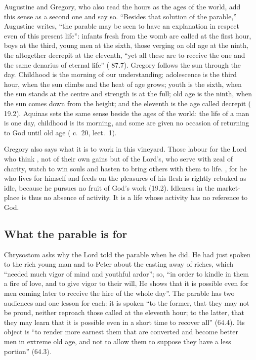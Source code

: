 Augustine and Gregory, who also read the hours as the ages of the world, add
this sense as a second one and say so. ``Besides that solution of the
parable,'' Augustine writes, ``the parable may be seen to have an explanation
in respect even of this present life'': infants fresh from the womb are
called at the first hour, boys at the third, young men at the sixth, those
verging on old age at the ninth, the altogether decrepit at the eleventh,
``yet all these are to receive the one and the same denarius of eternal life''
( 87.7). Gregory follows the sun through the day. Childhood is the
morning of our understanding; adolescence is the third hour, when the sun
climbs and the heat of age grows; youth is the sixth, when the sun stands at
the centre and strength is at the full; old age is the ninth, when the sun
comes down from the height; and the eleventh is the age called decrepit
( 19.2). Aquinas sets the same sense beside the
ages of the world: the life of a man is one day, childhood is its morning, and
some are given no occasion of returning to God until old age ( c.~20, lect.~1).

Gregory also says what it is to work in this vineyard. Those labour for the
Lord who think , not of their own gains but
of the Lord's, who serve with zeal of charity, watch to win souls and hasten
to bring others with them to life. , for he who
lives for himself and feeds on the pleasures of his flesh is rightly rebuked
as idle, because he pursues no fruit of God's work (19.2). Idleness in the
market-place is thus no absence of activity. It is a life whose activity has
no reference to God.

\subsection{What the parable is for}

Chrysostom asks why the Lord told the parable when he did. He had just spoken
to the rich young man and to Peter about the casting away of riches, which
``needed much vigor of mind and youthful ardor''; so, ``in order to kindle in
them a fire of love, and to give vigor to their will, He shows that it is
possible even for men coming later to receive the hire of the whole day''. The
parable has two audiences and one lesson for each: it is spoken ``to the
former, that they may not be proud, neither reproach those called at the
eleventh hour; to the latter, that they may learn that it is possible even in
a short time to recover all'' (64.4). Its object is ``to render more earnest
them that are converted and become better men in extreme old age, and not to
allow them to suppose they have a less portion'' (64.3).

